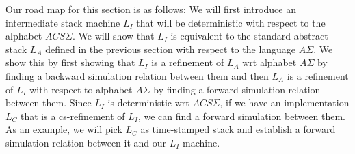 Our road map for this section is as follows: We will first introduce an intermediate stack machine $L_I$ that will be deterministic with respect to the alphabet $ACS\Sigma$. We will show that $L_I$ is equivalent to the standard abstract stack $L_A$ defined in the previous section with respect to the language $A\Sigma$. We show this by first showing that $L_I$ is a refinement of $L_A$ wrt alphabet $A\Sigma$ by finding a backward simulation relation between them and then $L_A$ is a refinement of $L_I$ with respect to alphabet $A\Sigma$ by finding a forward simulation relation between them. Since $L_I$ is deterministic wrt $ACS\Sigma$, if we have an implementation $L_C$ that is a cs-refinement of $L_I$, we can find a forward simulation between them. As an example, we will pick $L_C$ as time-stamped stack and establish a forward simulation relation between it and our $L_I$ machine. 

